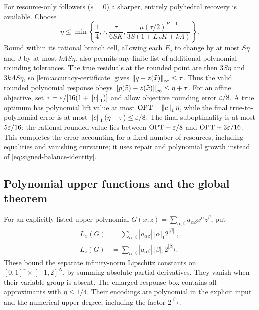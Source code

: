 For resource-only followers ($s=0$) a sharper, entirely polyhedral
recovery is available. Choose
\begin{equation}\label{eq:accuracy-resource-tolerance}
 \eta\le\min\left\{\frac14,\tau,\frac{\tau}{6SK},
 \frac{\mu(\tau/2)^{P+1}}{3S(1+L_FK+k\Lambda)}\right\}.
\end{equation}
Round within its rational branch cell, allowing each $E_j$ to change
by at most $S\eta$ and $J$ by at most $k\Lambda S\eta$.
 also permits any finite list of additional
polynomial rounding tolerances. The true residuals at the rounded
point are then $3S\eta$ and $3k\Lambda S\eta$, so
\cref{lem:accuracy-certificate} gives $\left\lVert q-z(\widehat x)\right\rVert_\infty\le\tau$.
Thus the valid rounded polynomial response obeys
$\left\lVert p(\widehat v)-z(\widehat x)\right\rVert_\infty\le\eta+\tau$.
For an affine objective, set $\tau=\varepsilon/[16(1+\left\lVert c\right\rVert_1)]$ and
allow objective rounding error $\varepsilon/8$. A true optimum has polynomial
lift value at most $\mathrm{OPT}+\left\lVert c\right\rVert_1\eta$, while the final
true-to-polynomial error is at most
$\left\lVert c\right\rVert_1(\eta+\tau)\le\varepsilon/8$.
The final suboptimality is at most $5\varepsilon/16$; the rational rounded
value lies between $\mathrm{OPT}-\varepsilon/8$ and
$\mathrm{OPT}+3\varepsilon/16$. This completes the error accounting for a
fixed number of resources, including equalities and vanishing curvature;
it uses repair and polynomial growth instead of
\eqref{eq:signed-balance-identity}.

\subsection{Polynomial upper functions and the global theorem}
\label{subsec:accuracy-polynomial-upper}

For an explicitly listed upper polynomial
$G(x,z)=\sum_{\alpha,\beta}a_{\alpha\beta}x^\alpha z^\beta$, put
\begin{equation}\label{eq:upper-polynomial-lipschitz}
 \begin{split}
 L_x(G)&=\sum_{\alpha,\beta}|a_{\alpha\beta}|\,|\alpha|_1
                                                        2^{|\beta|_1},\\
 L_z(G)&=\sum_{\alpha,\beta}|a_{\alpha\beta}|\,|\beta|_1
                                                        2^{|\beta|_1}.
 \end{split}
\end{equation}
These bound the separate infinity-norm Lipschitz constants on
$[0,1]^r\times[-1,2]^N$, by summing absolute partial derivatives.
They vanish when their variable group is absent. The enlarged
response box contains all approximants with $\eta\le1/4$.
Their encodings are polynomial in the explicit input and the numerical
upper degree, including the factor $2^{|\beta|_1}$.

